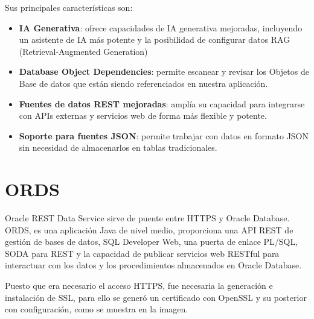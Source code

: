 Sus principales características son:
\begin{itemize}
	\item \textbf{IA Generativa}: ofrece capacidades de IA generativa mejoradas, incluyendo un asistente de IA más potente y la posibilidad de configurar datos RAG (Retrieval-Augmented Generation)
	\item \textbf{Database Object Dependencies}: permite escanear y revisar los Objetos de Base de datos que están siendo referenciados en nuestra aplicación.
	\item \textbf{Fuentes de datos REST mejoradas}: amplía su capacidad para integrarse con APIs externas y servicios web de forma más flexible y potente.
	\item \textbf{Soporte para fuentes JSON}: permite trabajar con datos en formato JSON sin necesidad de almacenarlos en tablas tradicionales.
	
\end{itemize}

\section{\acrshort{ORDS}}
Oracle \acrshort{REST} Data Service sirve de puente entre \acrshort{HTTPS} y Oracle Database. ORDS, es una aplicación Java de nivel medio, proporciona una API REST de gestión de bases de datos, SQL Developer Web, una puerta de enlace PL/SQL, SODA para REST y la capacidad de publicar servicios web RESTful para interactuar con los datos y los procedimientos almacenados en Oracle Database.

Puesto que era necesario el acceso \acrshort{HTTPS}, fue necesaria la generación e instalación de \acrshort{SSL}, para ello se generó un certificado con OpenSSL y su posterior con configuración, como se muestra en la imagen.

